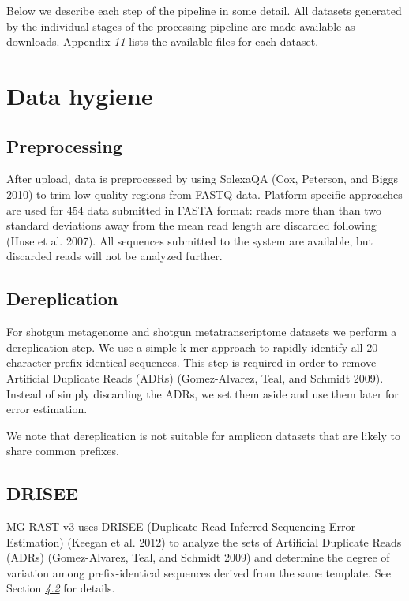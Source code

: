\documentclass[letterpaper,10pt,english]{sphinxmanual}
\begin{document}
Below we describe each step of the pipeline in some detail. All datasets
generated by the individual stages of the processing pipeline are made
available as downloads. Appendix {\hyperref[\detokenize{user_manual:chapter:downloads}]{\emph{11}}} lists the
available files for each dataset.


\section{Data hygiene}
\label{\detokenize{user_manual:data-hygiene}}

\subsection{Preprocessing}
\label{\detokenize{user_manual:preprocessing}}
After upload, data is preprocessed by using SolexaQA (Cox, Peterson, and
Biggs 2010) to trim low-quality regions from FASTQ data.
Platform-specific approaches are used for 454 data submitted in FASTA
format: reads more than than two standard deviations away from the mean
read length are discarded following (Huse et al. 2007). All sequences
submitted to the system are available, but discarded reads will not be
analyzed further.


\subsection{Dereplication}
\label{\detokenize{user_manual:dereplication}}
For shotgun metagenome and shotgun metatranscriptome datasets we perform
a dereplication step. We use a simple k-mer approach to rapidly identify
all 20 character prefix identical sequences. This step is required in
order to remove Artificial Duplicate Reads (ADRs) (Gomez-Alvarez, Teal,
and Schmidt 2009). Instead of simply discarding the ADRs, we set them
aside and use them later for error estimation.

We note that dereplication is not suitable for amplicon datasets that
are likely to share common prefixes.


\subsection{DRISEE}
\label{\detokenize{user_manual:drisee}}\label{\detokenize{user_manual:section-drisee}}
MG-RAST v3 uses DRISEE (Duplicate Read Inferred Sequencing Error
Estimation) (Keegan et al. 2012) to analyze the sets of Artificial
Duplicate Reads (ADRs) (Gomez-Alvarez, Teal, and Schmidt 2009) and
determine the degree of variation among prefix-identical sequences
derived from the same template. See Section {\hyperref[\detokenize{user_manual:DRISEEDETAIL}]{\emph{4.2}}} for
details.
\end{document}
